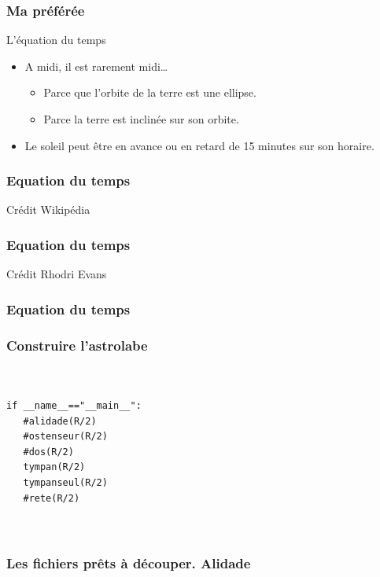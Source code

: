 \documentclass{beamer}
\begin{document}
\begin{frame}\frametitle{Ma préférée}
\begin{block}{L'équation du temps}
\begin{itemize}
\item A midi, il est rarement midi\dots
\begin{itemize}
\item Parce que l'orbite de la terre est une ellipse. 
\item Parce la terre est inclinée sur son orbite.
\end{itemize}
\item Le soleil peut être en avance ou en retard de 15 minutes sur son horaire. 
\end{itemize}

\end{block}

   \end{frame}
   \begin{frame}\frametitle{Equation du temps}
\begin{center}
\end{center}
\hfill \small Crédit Wikipédia
   \end{frame}
   
\begin{frame}\frametitle{Equation du temps}
\begin{center}
\end{center}

\hfill \small Crédit Rhodri Evans
   \end{frame}
   \begin{frame}\frametitle{Equation du temps}
\begin{center}
\end{center}
   \end{frame}

\begin{frame}[fragile]\frametitle{Construire l'astrolabe}
\begin{verbatim}
    

if __name__=="__main__":
   #alidade(R/2)  
   #ostenseur(R/2)
   #dos(R/2)
   tympan(R/2)
   tympanseul(R/2)
   #rete(R/2)
  
  

\end{verbatim}

   \end{frame}
   
   \begin{frame}\frametitle{Les fichiers prêts à découper.  Alidade}
\begin{center}
\end{center}
   \end{frame}
   
\end{document}

